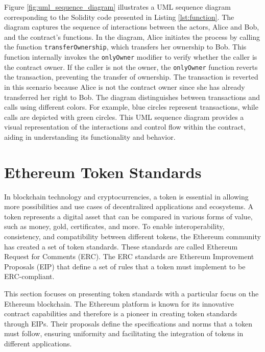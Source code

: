 Figure \ref{fig:uml_sequence_diagram} illustrates a UML sequence diagram corresponding to the Solidity code presented in Listing \ref{lst:function}. The diagram captures 
the sequence of interactions between the actors, Alice and Bob, and the contract's functions.
In the diagram, Alice initiates the process by calling the function \texttt{transferOwnership}, which transfers her ownership to Bob. This function internally invokes the 
\texttt{onlyOwner} modifier to verify whether the caller is the contract owner. If the caller is not the owner, the \texttt{onlyOwner} function reverts the transaction, 
preventing the transfer of ownership. The transaction is reverted in this scenario because Alice is not the contract owner since she has already transferred her right to Bob.
The diagram distinguishes between transactions and calls using different colors. For example, blue circles represent transactions, while calls are depicted with green circles.
This UML sequence diagram provides a visual representation of the interactions and control flow within the contract, aiding in understanding its functionality and behavior.


\section{Ethereum Token Standards}
\label{sec:ch2_ethereum_token_standards}

In blockchain technology and cryptocurrencies, a token is essential in allowing more possibilities and use cases of decentralized
applications and ecosystems. A token represents a digital asset that can be compared in various forms of value, such as money, gold, certificates, and more.
To enable interoperability, consistency, and compatibility between different tokens, the Ethereum community has created a set of token standards.
These standards are called Ethereum Request for Comments (ERC). The ERC standards are Ethereum Improvement Proposals (EIP) that define a set of rules
that a token must implement to be ERC-compliant.


This section focuses on presenting token standards with a particular focus on the Ethereum blockchain. The Ethereum platform is
known for its innovative contract capabilities and therefore is a pioneer in creating token standards through EIPs.
Their proposals define the specifications and norms that a token must follow, ensuring uniformity and facilitating the integration
of tokens in different applications.


